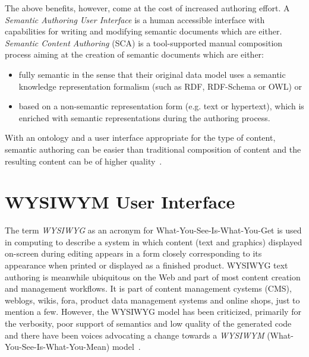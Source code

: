 \documentclass[journal]{IEEEtran}
\begin{document}
The above benefits, however, come at the cost of increased authoring effort. %
A \emph{Semantic Authoring User Interface} is a human accessible interface with capabilities for writing and modifying semantic documents which are either.
\emph{Semantic Content Authoring} (SCA) is a tool-supported manual composition process aiming at the creation of semantic documents which are either:
\begin{itemize}
	\item fully semantic in the sense that their original data model uses a semantic knowledge representation formalism (such as RDF, RDF-Schema or OWL) or
	\item based on a non-semantic representation form (e.g. text or hypertext), which is enriched with semantic representations during the authoring process.\\
\end{itemize}

With an ontology and a user interface appropriate for the type of content, semantic authoring can be easier than traditional composition of content and the resulting content can be of higher quality~\cite{hasida2007}.


\section{WYSIWYM User Interface}
\label{sec:wysiwym}

The term \emph{WYSIWYG} as an acronym for What-You-See-Is-What-You-Get is used in computing to describe a system in which content (text and graphics) displayed on-screen during editing appears in a form closely corresponding to its appearance when printed or displayed as a finished product.
WYSIWYG text authoring is meanwhile ubiquitous on the Web and part of most content creation and management workflows.
It is part of content management cystems (CMS), weblogs, wikis, fora, product data management systems and online shops, just to mention a few.
However, the WYSIWYG model has been criticized, primarily for the verbosity, poor support of semantics and low quality of the generated code and there have been voices advocating a change towards a \emph{WYSIWYM} (What-You-See-Is-What-You-Mean) model~\cite{Spiesser2004,Sauer2006}.
\end{document}
